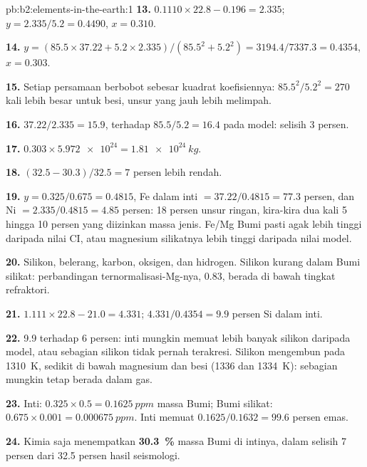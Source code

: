 \begin{solution}{pb:b2:elements-in-the-earth:1}
\textbf{13.} $0.1110\times22.8 - 0.196 = 2.335$; $y = 2.335/5.2 = 0.4490$, $x = 0.310$.

\textbf{14.} $y = (85.5\times37.22 + 5.2\times2.335)/(85.5^2 + 5.2^2) =
3194.4/7337.3 = 0.4354$, $x = 0.303$.

\textbf{15.} Setiap persamaan berbobot sebesar kuadrat koefisiennya: $85.5^2/5.2^2 = 270$
kali lebih besar untuk besi, unsur yang jauh lebih melimpah.

\textbf{16.} $37.22/2.335 = 15.9$, terhadap $85.5/5.2 = 16.4$ pada model: selisih 3
persen.

\textbf{17.} $0.303\times\num{5.972e24} = \qty{1.81e24}{kg}$.

\textbf{18.} $(32.5-30.3)/32.5 = 7$ persen lebih rendah.

\textbf{19.} $y = 0.325/0.675 = 0.4815$, Fe dalam inti $= 37.22/0.4815 = 77.3$ persen,
dan Ni $= 2.335/0.4815 = 4.85$ persen: 18 persen unsur ringan, kira-kira dua kali 5 hingga
10 persen yang diizinkan massa jenis. Fe/Mg Bumi pasti agak lebih tinggi daripada nilai
CI, atau magnesium silikatnya lebih tinggi daripada nilai model.

\textbf{20.} Silikon, belerang, karbon, oksigen, dan hidrogen. Silikon kurang dalam
Bumi silikat: perbandingan ternormalisasi-Mg-nya, 0.83, berada di bawah tingkat refraktori.

\textbf{21.} $1.111\times22.8 - 21.0 = 4.331$; $4.331/0.4354 = 9.9$ persen Si dalam
inti.

\textbf{22.} 9.9 terhadap 6 persen: inti mungkin memuat lebih banyak silikon daripada model, atau
sebagian silikon tidak pernah terakresi. Silikon mengembun pada \qty{1310}{K}, sedikit
di bawah magnesium dan besi (1336 dan \qty{1334}{K}): sebagian mungkin tetap berada dalam gas.

\textbf{23.} Inti: $0.325\times0.5 = \qty{0.1625}{ppm}$ massa Bumi; Bumi
silikat: $0.675\times0.001 = \qty{0.000675}{ppm}$. Inti memuat
$0.1625/0.1632 = 99.6$ persen emas.

\textbf{24.} Kimia saja menempatkan
\textbf{\qty[text-series-to-math=true]{30.3}{\percent}} massa Bumi di intinya,
dalam selisih 7 persen dari 32.5 persen hasil seismologi.
\end{solution}
